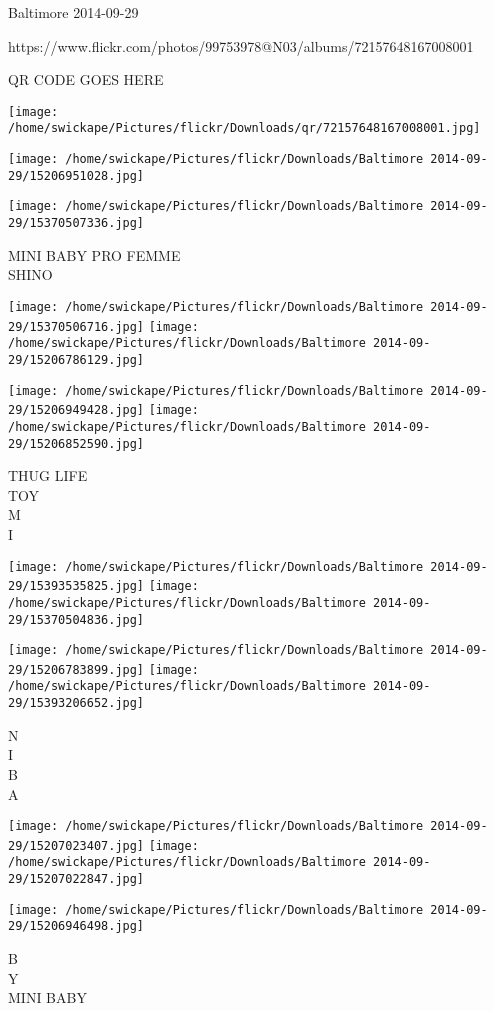 \documentclass[10pt,letterpaper]{article}
\begin{document}
Baltimore 2014-09-29

https://www.flickr.com/photos/99753978@N03/albums/72157648167008001

QR CODE GOES HERE

\texttt{[image: /home/swickape/Pictures/flickr/Downloads/qr/72157648167008001.jpg]}
\pagebreak

\texttt{[image: /home/swickape/Pictures/flickr/Downloads/Baltimore 2014-09-29/15206951028.jpg]}

\vspace{0.25in}
\texttt{[image: /home/swickape/Pictures/flickr/Downloads/Baltimore 2014-09-29/15370507336.jpg]}

MINI BABY PRO FEMME\\
SHINO\\
\pagebreak

\texttt{[image: /home/swickape/Pictures/flickr/Downloads/Baltimore 2014-09-29/15370506716.jpg]}
\texttt{[image: /home/swickape/Pictures/flickr/Downloads/Baltimore 2014-09-29/15206786129.jpg]}

\texttt{[image: /home/swickape/Pictures/flickr/Downloads/Baltimore 2014-09-29/15206949428.jpg]}
\texttt{[image: /home/swickape/Pictures/flickr/Downloads/Baltimore 2014-09-29/15206852590.jpg]}

THUG LIFE\\
TOY\\
M\\
I\\
\pagebreak

\texttt{[image: /home/swickape/Pictures/flickr/Downloads/Baltimore 2014-09-29/15393535825.jpg]}
\texttt{[image: /home/swickape/Pictures/flickr/Downloads/Baltimore 2014-09-29/15370504836.jpg]}

\texttt{[image: /home/swickape/Pictures/flickr/Downloads/Baltimore 2014-09-29/15206783899.jpg]}
\texttt{[image: /home/swickape/Pictures/flickr/Downloads/Baltimore 2014-09-29/15393206652.jpg]}

N\\
I\\
B\\
A\\
\pagebreak

\texttt{[image: /home/swickape/Pictures/flickr/Downloads/Baltimore 2014-09-29/15207023407.jpg]}
\texttt{[image: /home/swickape/Pictures/flickr/Downloads/Baltimore 2014-09-29/15207022847.jpg]}

\vspace{0.25in}
\texttt{[image: /home/swickape/Pictures/flickr/Downloads/Baltimore 2014-09-29/15206946498.jpg]}

B\\
Y\\
MINI BABY\\
\pagebreak
\end{document}
